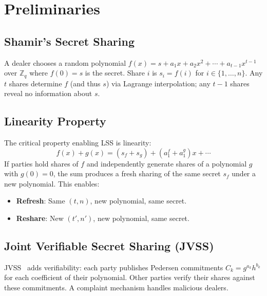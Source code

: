 \section{Preliminaries}


\subsection{Shamir's Secret Sharing}

\begin{definition}
A dealer chooses a random polynomial $f(x) = s + a_1 x + a_2 x^2 + \cdots + a_{t-1} x^{t-1}$ over $\mathbb{Z}_q$ where $f(0) = s$ is the secret. Share $i$ is $s_i = f(i)$ for $i \in \{1, \ldots, n\}$. Any $t$ shares determine $f$ (and thus $s$) via Lagrange interpolation; any $t - 1$ shares reveal no information about $s$.
\end{definition}

\subsection{Linearity Property}

The critical property enabling LSS is linearity:
\begin{equation}
  f(x) + g(x) = (s_f + s_g) + (a_1^f + a_1^g)x + \cdots
\end{equation}
If parties hold shares of $f$ and independently generate shares of a polynomial $g$ with $g(0) = 0$, the sum produces a fresh sharing of the same secret $s_f$ under a new polynomial. This enables:
\begin{itemize}[nosep]
  \item \textbf{Refresh}: Same $(t, n)$, new polynomial, same secret.
  \item \textbf{Reshare}: New $(t', n')$, new polynomial, same secret.
\end{itemize}

\subsection{Joint Verifiable Secret Sharing (JVSS)}

JVSS~\cite{pedersen1991} adds verifiability: each party publishes Pedersen commitments $C_k = g^{a_k} h^{b_k}$ for each coefficient of their polynomial. Other parties verify their shares against these commitments. A complaint mechanism handles malicious dealers.

